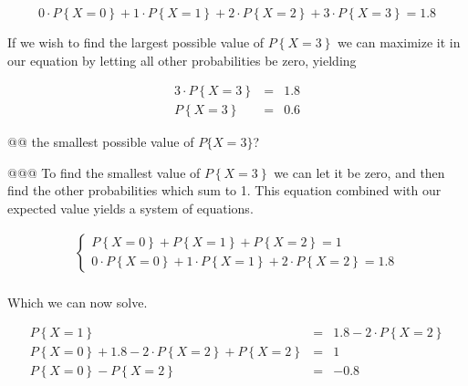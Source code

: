 \documentclass[11pt]{article}\usepackage[]{graphicx}\usepackage[]{xcolor}
\begin{document}
\begin{easylist}[enumerate]
    \begin{equation}
            0 \cdot P\left\{ X=0 \right\} +
            1 \cdot P\left\{ X=1 \right\} +
            2 \cdot P\left\{ X=2 \right\} +
            3 \cdot P\left\{ X=3 \right\} = 1.8
    \end{equation}

    If we wish to find the largest possible value of $P\left\{ X=3 \right\}$ we can maximize it in our equation by
    letting all other probabilities be zero, yielding

    \begin{equation}
        \begin{aligned}
            3 \cdot P\left\{ X=3 \right\} &=& 1.8\\
            P\left\{ X=3 \right\}&=& 0.6
        \end{aligned}
    \end{equation}

    @@ the smallest possible value of $P\{X = 3\}$?

    @@@ To find the smallest value of $P\left\{ X=3 \right\}$ we can let it be zero, and then find the other
    probabilities which sum to 1. This equation combined with our expected value yields a system of equations.

    \begin{equation}
        \begin{aligned}
            \begin{cases}
                P\left\{ X=0 \right\} +
                P\left\{ X=1 \right\} +
                P\left\{ X=2 \right\} = 1\\
                0 \cdot P\left\{ X=0 \right\} +
                1 \cdot P\left\{ X=1 \right\} +
                2 \cdot P\left\{ X=2 \right\} = 1.8
            \end{cases}\\
        \end{aligned}
    \end{equation}

    Which we can now solve.

    \begin{equation}
        \begin{aligned}
            P\left\{ X=1 \right\} &=& 1.8 - 2 \cdot P\left\{ X=2 \right\}\\
            P\left\{ X=0 \right\} + 1.8 - 2 \cdot P\left\{ X=2 \right\} + P\left\{ X=2 \right\} &=& 1\\
            P\left\{ X=0 \right\} - P\left\{ X=2 \right\} &=& -0.8\\
        \end{aligned}
    \end{equation}


\end{easylist}
\end{document}
